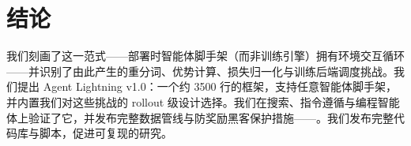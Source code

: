 \section{结论}

我们刻画了\emph{\add{\harl{}}}这一范式——部署时智能体脚手架（而非训练引擎）拥有环境交互循环——并识别了由此产生的重分词、优势计算、损失归一化与训练后端调度挑战。我们提出 Agent Lightning v1.0：一个约 3500 行的框架，支持任意智能体脚手架，并内置我们对这些挑战的 rollout 级设计选择。我们在搜索、指令遵循与编程智能体上验证了它，并发布完整数据管线与防奖励黑客保护措施——。我们发布完整代码库与脚本，促进可复现的\add{\harl{}}研究。
